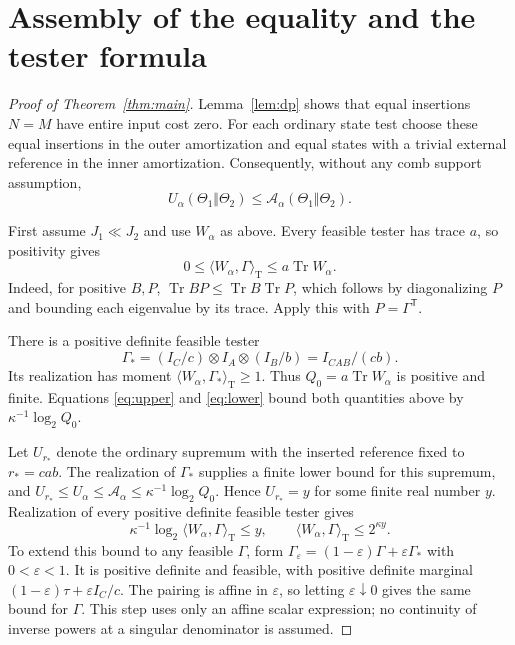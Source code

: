 \documentclass[11pt]{article}
\newcommand{\Tr}{\operatorname{Tr}}
\newcommand{\U}{U_\alpha}
\newcommand{\Adiv}{\mathcal A_\alpha}
\newcommand{\pair}[2]{\langle #1,#2\rangle_{\mathrm T}}
\theoremstyle{remark}
\begin{document}
\section{Assembly of the equality and the tester formula}
\begin{proof}[Proof of Theorem~\ref{thm:main}]
Lemma~\ref{lem:dp} shows that equal insertions $N=M$ have entire input cost
zero. For each ordinary state test choose these equal insertions in the
outer amortization and equal states with a trivial external reference in
the inner amortization. Consequently, without any comb support assumption,
\begin{equation}\label{eq:lower}
 \U(\Theta_1\Vert\Theta_2)\leq\Adiv(\Theta_1\Vert\Theta_2).
\end{equation}

First assume $J_1\ll J_2$ and use $W_\alpha$ as above. Every feasible tester
has trace $a$, so positivity gives
\begin{equation}\label{eq:crude}
 0\leq\pair{W_\alpha}{\Gamma}\leq a\Tr W_\alpha.
\end{equation}
Indeed, for positive $B,P$, $\Tr BP\leq\Tr B\Tr P$, which follows by
diagonalizing $P$ and bounding each eigenvalue by its trace. Apply this
with $P=\Gamma^{\mathsf T}$.

There is a positive definite feasible tester
\begin{equation}\label{eq:star}
 \Gamma_*=(I_C/c)\otimes I_A\otimes(I_B/b)=I_{CAB}/(cb).
\end{equation}
Its realization has moment $\pair{W_\alpha}{\Gamma_*}\geq1$. Thus
$Q_0=a\Tr W_\alpha$ is positive and finite. Equations
\eqref{eq:upper} and \eqref{eq:lower} bound both quantities above by
$\kappa^{-1}\log_2Q_0$.

Let $U_{r_*}$ denote the ordinary supremum with the inserted reference fixed
to $r_*=cab$. The realization of $\Gamma_*$ supplies a finite lower bound
for this supremum, and
$U_{r_*}\leq\U\leq\Adiv\leq\kappa^{-1}\log_2Q_0$.
Hence $U_{r_*}=y$ for some finite real number $y$. Realization of every
positive definite feasible tester gives
\[
 \kappa^{-1}\log_2\pair{W_\alpha}{\Gamma}\leq y,
 \qquad\pair{W_\alpha}{\Gamma}\leq2^{\kappa y}.
\]
To extend this bound to any feasible $\Gamma$, form
$\Gamma_\varepsilon=(1-\varepsilon)\Gamma+\varepsilon\Gamma_*$ with
$0<\varepsilon<1$. It is positive definite and feasible, with positive
definite marginal $(1-\varepsilon)\tau+\varepsilon I_C/c$. The pairing
is affine in $\varepsilon$, so letting $\varepsilon\downarrow0$ gives
the same bound for $\Gamma$. This step uses only an affine scalar
expression; no continuity of inverse powers at a singular denominator is
assumed.


\end{proof}
\end{document}
